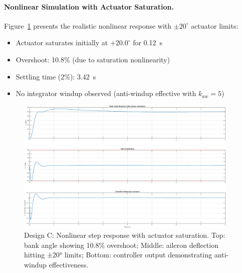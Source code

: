 \paragraph{Nonlinear Simulation with Actuator Saturation.}
Figure~\ref{fig:nonlinear_response} presents the realistic nonlinear response with $\pm20^\circ$ actuator limits:
\begin{itemize}
    \item Actuator saturates initially at $+20.0^\circ$ for 0.12~s
    \item Overshoot: 10.8\% (due to saturation nonlinearity)
    \item Settling time (2\%): 3.42~s
    \item No integrator windup observed (anti-windup effective with $k_{aw}=5$)
\end{itemize}

\begin{figure}[h!]
\centering
\includegraphics[width=0.95\textwidth]{../MATLAB/LaTeX_Exports/nonlinear_response.pdf}
\caption{Design C: Nonlinear step response with actuator saturation. Top: bank angle showing 10.8\% overshoot; Middle: aileron deflection hitting ±20° limits; Bottom: controller output demonstrating anti-windup effectiveness.}
\label{fig:nonlinear_response}
\end{figure}

